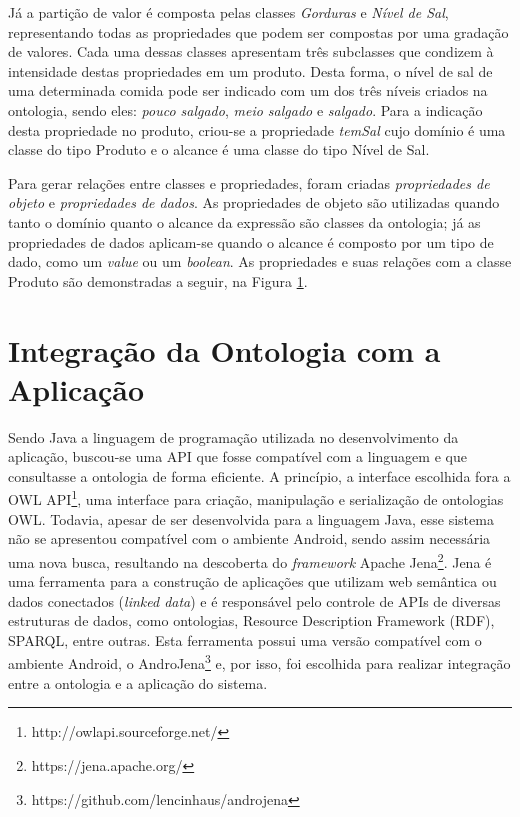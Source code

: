 Já a partição de valor é composta pelas classes \emph{Gorduras} e \emph{Nível de Sal}, representando todas as propriedades que podem ser compostas por uma gradação de valores. Cada uma dessas classes apresentam três subclasses que condizem à intensidade destas propriedades em um produto. Desta forma, o nível de sal de uma determinada comida pode ser indicado com um dos três níveis criados na ontologia, sendo eles: \emph{pouco salgado}, \emph{meio salgado} e \emph{salgado}. Para a indicação desta propriedade no produto, criou-se a propriedade \emph{temSal} cujo domínio é uma classe do tipo Produto e o alcance é uma classe do tipo Nível de Sal. 

Para gerar relações entre classes e propriedades, foram criadas \emph{propriedades de objeto} e \emph{propriedades de dados}. As propriedades de objeto são utilizadas quando tanto o domínio quanto o alcance da expressão são classes da ontologia; já as propriedades de dados aplicam-se quando o alcance é composto por um tipo de dado, como um \emph{value} ou um \emph{boolean}. As propriedades e suas relações com a classe Produto são demonstradas a seguir, na Figura \ref{}.
\begin{figure}
	
\end{figure}

\section{Integração da Ontologia com a Aplicação}

Sendo Java a linguagem de programação utilizada no desenvolvimento da aplicação, buscou-se uma API que fosse compatível com a linguagem e que consultasse a ontologia de forma eficiente. A princípio, a interface escolhida fora a OWL API\footnote{http://owlapi.sourceforge.net/}, uma interface para criação, manipulação e serialização de ontologias OWL. Todavia, apesar de ser desenvolvida para a linguagem Java, esse sistema não se apresentou compatível com o ambiente Android, sendo assim necessária uma nova busca, resultando na descoberta do \emph{framework} Apache Jena\footnote{https://jena.apache.org/}. Jena é uma ferramenta para a construção de aplicações que utilizam web semântica ou dados conectados (\emph{linked data}) e é responsável pelo controle de APIs de diversas estruturas de dados, como ontologias, Resource Description Framework (RDF), SPARQL, entre outras. Esta ferramenta possui uma versão compatível com o ambiente Android, o AndroJena\footnote{https://github.com/lencinhaus/androjena} e, por isso, foi escolhida para realizar integração entre a ontologia e a aplicação do sistema.


